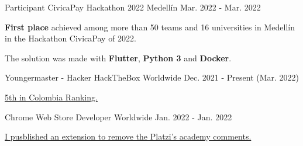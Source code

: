 
\begin{cventries}

  \cventry
    {Participant} %
    {CivicaPay Hackathon 2022} %
    {Medellín} %
    {Mar. 2022 - Mar. 2022} %
    {
      \begin{cvitems} %
        \item {\textbf{First place} achieved among more than 50 teams and 16 universities in 
        Medellín in the Hackathon CivicaPay of 2022.}
        \item {The solution was made with \textbf{Flutter}, \textbf{Python 3} and \textbf{Docker}.}
      \end{cvitems}
    }

  \cventry
    {Youngermaster - Hacker} %
    {HackTheBox} %
    {Worldwide} %
    {Dec. 2021 - Present (Mar. 2022)} %
    {
      \begin{cvitems} %
        \item {\href{https://app.hackthebox.com/profile/643960}{5th in Colombia Ranking.}}
      \end{cvitems}
    }

  \cventry
    {Chrome Web Store} %
    {Developer} %
    {Worldwide} %
    {Jan. 2022 - Jan. 2022} %
    {
      \begin{cvitems} %
        \item {\href{https://chrome.google.com/webstore/detail/platzi-community-wrapper/dakgbbfpefoofghfbkopnbnpadeblbep}
        {I pusblished an extension to remove the Platzi's academy comments.}}
      \end{cvitems}
    }



\end{cventries}
